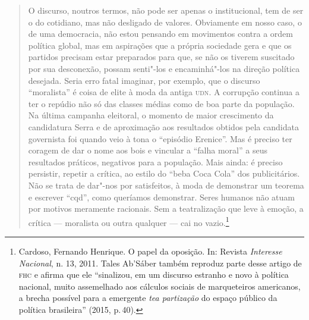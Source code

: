 \begin{quote}
O discurso, noutros termos, não pode ser apenas o institucional, tem de
ser o do cotidiano, mas não desligado de valores. Obviamente em nosso
caso, o de uma democracia, não estou pensando em movimentos contra a
ordem política global, mas em aspirações que a própria sociedade gera e
que os partidos precisam estar preparados para que, se não os tiverem
suscitado por sua desconexão, possam senti"-los e encaminhá"-los na
direção política desejada. Seria erro fatal imaginar, por exemplo, que o
discurso ``moralista'' é coisa de elite à moda da antiga \textsc{udn}. A
corrupção continua a ter o repúdio não só das classes médias como de boa
parte da população. Na última campanha eleitoral, o momento de maior
crescimento da candidatura Serra e de aproximação aos resultados obtidos
pela candidata governista foi quando veio à tona o ``episódio Erenice''.
Mas é preciso ter coragem de dar o nome aos bois e vincular a ``falha
moral'' a seus resultados práticos, negativos para a população. Mais
ainda: é preciso persistir, repetir a crítica, ao estilo do ``beba Coca
Cola'' dos publicitários. Não se trata de dar"-nos por satisfeitos, à
moda de demonstrar um teorema e escrever ``cqd'', como queríamos
demonstrar. Seres humanos não atuam por motivos meramente racionais. Sem
a teatralização que leve à emoção, a crítica --- moralista ou outra
qualquer --- cai no vazio.\footnote{Cardoso, Fernando Henrique. O papel
  da oposição. In: Revista \emph{Interesse Nacional}, n. 13, 2011. Tales
  Ab'Sáber também reproduz parte desse artigo de \textsc{fhc} e afirma que ele
  ``sinalizou, em um discurso estranho e novo à política nacional, muito
  assemelhado aos cálculos sociais de marqueteiros americanos, a brecha
  possível para a emergente \emph{tea partização} do espaço público da
  política brasileira'' (2015, p.\,40).}
\end{quote}

